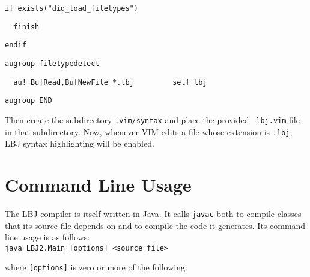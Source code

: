 \vspace{-.25cm}
\verb|if exists("did_load_filetypes")|

\verb|  finish|

\verb|endif|

\verb|augroup filetypedetect|

\verb|  au! BufRead,BufNewFile *.lbj         setf lbj|

\verb|augroup END| \\
\vspace{-.25cm}

\noindent
Then create the subdirectory {\tt .vim/syntax} and place the provided {\tt
lbj.vim} file in that subdirectory.  Now, whenever VIM edits a file whose
extension is {\tt .lbj}, LBJ syntax highlighting will be enabled.

\newpage
\section{Command Line Usage} \label{section:commandLine}

The LBJ compiler is itself written in Java.  It calls {\tt javac} both to
compile classes that its source file depends on and to compile the code it
generates.  Its command line usage is as follows: \\

\vspace{-.25cm}
{\tt java LBJ2.Main [options] <source file>} \\
\vspace{-.25cm}

\noindent
where {\tt [options]} is zero or more of the following:

